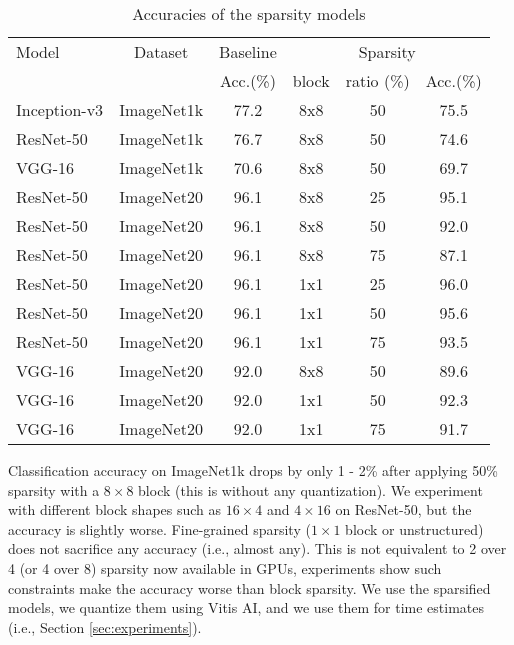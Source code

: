 \documentclass{IEEEtran}
\begin{document}
\begin{table}[ht]
\caption{Accuracies of the sparsity models}
\label{tab_acc}
\begin{center} 
\scalebox{0.9}
{
\begin{tabular}{|l|c|c|c|c|c|}
\hline
\rule[-1ex]{0pt}{3.5ex}  Model & Dataset & Baseline  & \multicolumn{3}{c|}{Sparsity}\\
\rule[-1ex]{0pt}{3.5ex}  {} & {} & Acc.(\%) & block & ratio (\%) & Acc.(\%)    \\\hline\hline
\rule[-1ex]{0pt}{3.5ex}  Inception-v3 & ImageNet1k & 77.2 & 8x8 & 50 & 75.5  \\\hline
\rule[-1ex]{0pt}{3.5ex}  ResNet-50 & ImageNet1k & 76.7 & 8x8 & 50 & 74.6  \\\hline
\rule[-1ex]{0pt}{3.5ex}  VGG-16    & ImageNet1k & 70.6 & 8x8 & 50 & 69.7  \\\hline \hline
\rule[-1ex]{0pt}{3.5ex}  ResNet-50 & ImageNet20 & 96.1 & 8x8 & 25 & 95.1  \\\hline
\rule[-1ex]{0pt}{3.5ex}  ResNet-50 & ImageNet20 & 96.1 & 8x8 & 50 & 92.0  \\\hline
\rule[-1ex]{0pt}{3.5ex}  ResNet-50 & ImageNet20 & 96.1 & 8x8 & 75 & 87.1  \\\hline
\rule[-1ex]{0pt}{3.5ex}  ResNet-50 & ImageNet20 & 96.1 & 1x1 & 25 & 96.0  \\\hline
\rule[-1ex]{0pt}{3.5ex}  ResNet-50 & ImageNet20 & 96.1 & 1x1 & 50 & 95.6  \\\hline
\rule[-1ex]{0pt}{3.5ex}  ResNet-50 & ImageNet20 & 96.1 & 1x1 & 75 & 93.5  \\\hline
\rule[-1ex]{0pt}{3.5ex}  VGG-16    & ImageNet20 & 92.0 & 8x8 & 50 & 89.6  \\\hline
\rule[-1ex]{0pt}{3.5ex}  VGG-16    & ImageNet20 & 92.0 & 1x1 & 50 & 92.3  \\\hline
\rule[-1ex]{0pt}{3.5ex}  VGG-16    & ImageNet20 & 92.0 & 1x1 & 75 & 91.7  \\\hline
\end{tabular}\vspace{-20pt}
}
\end{center}
\end{table}

Classification accuracy on ImageNet1k drops by only 1 - 2\% after
applying 50\% sparsity with a $8\times 8$ block (this is without any
quantization). We experiment with different block shapes such as
$16\times 4$ and $4\times 16$ on ResNet-50, but the accuracy is
slightly worse. Fine-grained sparsity ($1\times 1$ block or
unstructured) does not sacrifice any accuracy (i.e., almost any). This
is not equivalent to 2 over 4 (or 4 over 8) sparsity now available in
GPUs, experiments show such constraints make the accuracy worse than
block sparsity. We use the sparsified models, we quantize them using
Vitis AI, and we use them for time estimates (i.e., Section
\ref{sec:experiments}).
\end{document}
